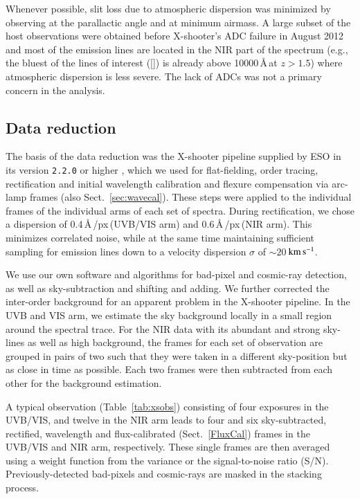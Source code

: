 \documentclass[traditabstract, longauth]{aa}
\newcommand{\kms}{$\rm{km\,s^{-1}}$}
\newcommand{\oii}{[\ion{O}{ii}]}
\begin{document}
Whenever possible, slit loss due to atmospheric dispersion was minimized by observing at the parallactic angle and at minimum airmass. A large subset of the host observations were obtained before X-shooter's ADC failure in August 2012 and most of the emission lines are located in the NIR part of the spectrum (e.g., the bluest of the lines of interest (\oii) is already above 10000\,\AA\,at $z>1.5$) where atmospheric dispersion is less severe. The lack of ADCs was not a primary concern in the analysis.

\subsection{Data reduction}

The basis of the data reduction was the X-shooter pipeline supplied by ESO in its version \texttt{2.2.0} or higher \citep{2006SPIE.6269E..80G, 2010SPIE.7737E..56M}, which we used for flat-fielding, order tracing, rectification and initial wavelength calibration and flexure compensation via arc-lamp frames (also Sect.~\ref{sec:wavecal}). These steps were applied to the individual frames of the individual arms of each set of spectra. During rectification, we chose a dispersion of 0.4\,\AA\,/px\,(UVB/VIS arm) and 0.6\,\AA\,/px\,(NIR arm). This minimizes correlated noise, while at the same time maintaining sufficient sampling for emission lines down to a velocity dispersion $\sigma$ of $\sim20\,$\kms. 

We use our own software and algorithms for bad-pixel and cosmic-ray detection, as well as sky-subtraction and shifting and adding. We further corrected the inter-order background for an apparent problem in the X-shooter pipeline. In the UVB and VIS arm, we estimate the sky background locally in a small region around the spectral trace. For the NIR data with its abundant and strong sky-lines as well as high background, the frames for each set of observation are grouped in pairs of two such that they were taken in a different sky-position but as close in time as possible. Each two frames were then subtracted from each other for the background estimation.

A typical observation (Table~\ref{tab:xsobs}) consisting of four exposures in the UVB/VIS, and twelve in the NIR arm leads to four and six sky-subtracted, rectified, wavelength and flux-calibrated (Sect.~\ref{FluxCal}) frames in the UVB/VIS and NIR arm, respectively. These single frames are then averaged using a weight function from the variance or the signal-to-noise ratio (S/N). Previously-detected bad-pixels and cosmic-rays are masked in the stacking process.
\end{document}
